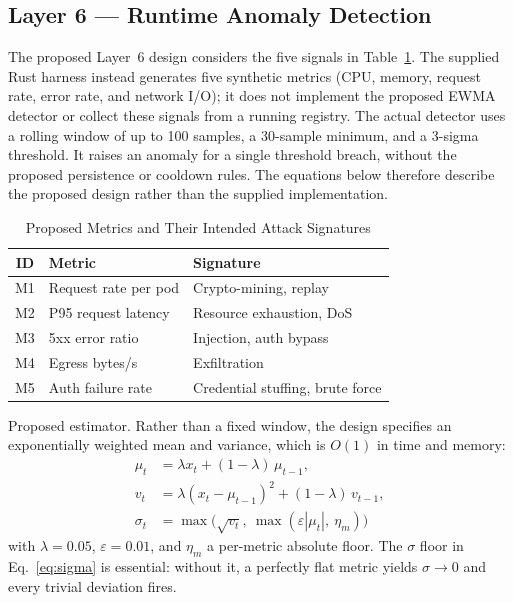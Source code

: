 \documentclass{ieeeaccess}
\renewcommand{\textbf}[1]{#1}
\begin{document}
\subsection{Layer 6 --- Runtime Anomaly Detection}
\label{subsec:layer6}

The proposed Layer~6 design considers the five signals in Table~\ref{tab:metrics}. The supplied Rust harness instead generates five synthetic metrics (CPU, memory, request rate, error rate, and network I/O); it does not implement the proposed EWMA detector or collect these signals from a running registry. The actual detector uses a rolling window of up to 100 samples, a 30-sample minimum, and a 3-sigma threshold. It raises an anomaly for a single threshold breach, without the proposed persistence or cooldown rules. The equations below therefore describe the proposed design rather than the supplied implementation.

\begin{table}[ht]
\caption{Proposed Metrics and Their Intended Attack Signatures}
\label{tab:metrics}
\centering
\setlength{\tabcolsep}{3pt}
\begin{tabular}{|c|p{58pt}|p{56pt}|}
\hline
\textbf{ID} & \textbf{Metric} & \textbf{Signature} \\
\hline
M1 & Request rate per pod & Crypto-mining, replay \\
\hline
M2 & P95 request latency & Resource exhaustion, DoS \\
\hline
M3 & 5xx error ratio & Injection, auth bypass \\
\hline
M4 & Egress bytes/s & Exfiltration \\
\hline
M5 & Auth failure rate & Credential stuffing, brute force \\
\hline
\end{tabular}
\end{table}

\noindent\textbf{Proposed estimator.} Rather than a fixed window, the design specifies an exponentially weighted mean and variance, which is $O(1)$ in time and memory:
\begin{align}
\mu_t &= \lambda x_t + (1-\lambda)\,\mu_{t-1}, \label{eq:ewma}\\
v_t  &= \lambda (x_t - \mu_{t-1})^2 + (1-\lambda)\,v_{t-1}, \label{eq:ewmv}\\
\sigma_t &= \max\!\bigl(\sqrt{v_t},\ \max(\varepsilon|\mu_t|,\ \eta_m)\bigr)
\label{eq:sigma}
\end{align}
with $\lambda = 0.05$, $\varepsilon = 0.01$, and $\eta_m$ a per-metric absolute floor. The $\sigma$ floor in Eq.~\ref{eq:sigma} is essential: without it, a perfectly flat metric yields $\sigma \to 0$ and every trivial deviation fires.
\end{document}
